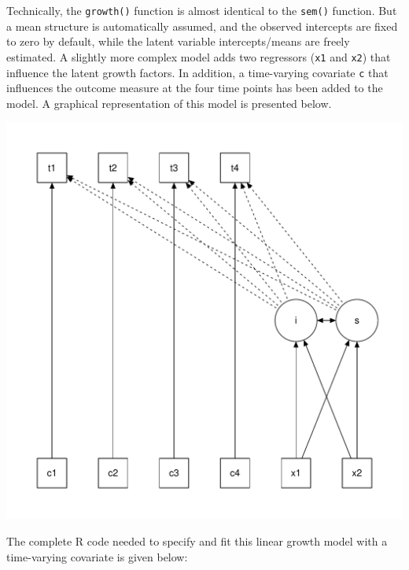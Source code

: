 Technically, the \texttt{growth()} function is almost identical to the
\texttt{sem()} function. But a mean structure is automatically assumed,
and the observed intercepts are fixed to zero by default, while the
latent variable intercepts/means are freely estimated. A slightly more
complex model adds two regressors (\texttt{x1} and \texttt{x2}) that
influence the latent growth factors. In addition, a time-varying
covariate \texttt{c} that influences the outcome measure at the four
time points has been added to the model. A graphical representation of
this model is presented below.

\includegraphics{figure/growth-1.pdf}

The complete R code needed to specify and fit this linear growth model
with a time-varying covariate is given below:

\begin{Shaded}
\begin{Highlighting}[]
\OtherTok{\textless{}{-}} \StringTok{\textquotesingle{}}
\StringTok{\textquotesingle{}}
\OtherTok{\textless{}{-}} 
\end{Highlighting}
\end{Shaded}
